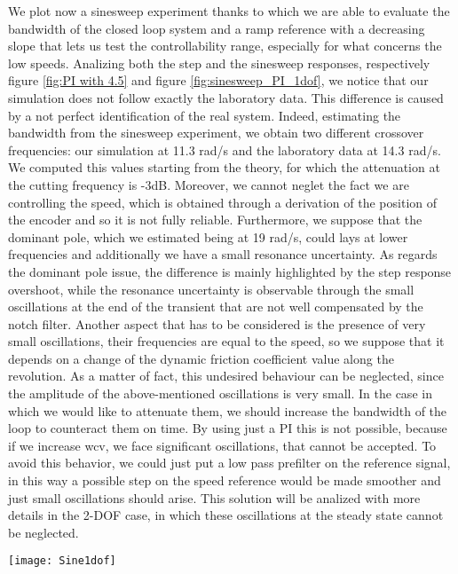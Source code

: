 We plot now a sinesweep experiment thanks to which we are able to evaluate the bandwidth of the closed loop system and a ramp reference with a decreasing slope that lets us test the controllability range, especially for what concerns the low speeds. 
Analizing both the step and the sinesweep responses, respectively figure \ref{fig:PI with 4.5} and figure \ref{fig:sinesweep_PI_1dof}, we notice that our simulation does not follow exactly the laboratory data. This difference is caused by a not perfect identification of the real system. Indeed, estimating the bandwidth from the sinesweep experiment, we obtain two different crossover frequencies: our simulation at 11.3 rad/s and the laboratory data at 14.3 rad/s. We computed this values starting from the theory, for which the attenuation at the cutting frequency is -3dB. Moreover, we cannot neglet the fact we are controlling the speed, which is obtained through a derivation of the position of the encoder and so it is not fully reliable. Furthermore, we suppose that the dominant pole, which we estimated being at 19 rad/s, could lays at lower frequencies and additionally we have a small resonance uncertainty. As regards the dominant pole issue, the difference is mainly highlighted by the step response overshoot, while the resonance uncertainty is observable through the small oscillations at the end of the transient that are not well compensated by the notch filter.
Another aspect that has to be considered is the presence of very small oscillations, their frequencies are equal to the speed, so we suppose that it depends on a change of the dynamic friction coefficient value along the revolution. As a matter of fact, this undesired behaviour can be neglected, since the amplitude of the above-mentioned oscillations is very small. In the case in which we would like to attenuate them, we should increase the bandwidth of the loop to counteract them on time. By using just a PI this is not possible, because if we increase wcv, we face significant oscillations, that cannot be accepted. To avoid this behavior, we could just put a low pass prefilter on the reference signal, in this way a possible step on the speed reference would be made smoother and just small oscillations should arise. This solution will be analized with more details in the 2-DOF case, in which these oscillations at the steady state cannot be neglected.
\newpage
\begin{figure*}[h]
	\centering
	\texttt{[image: Sine1dof]}
	\caption{Sineweep experiment from 0.1 Hz to 10 Hz in 100s}
	\label{fig:sinesweep_PI_1dof}
\end{figure*}

